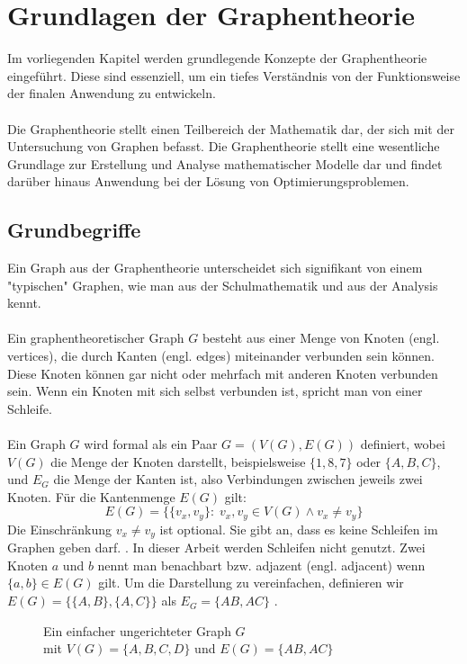 \newpage
\section{Grundlagen der Graphentheorie}
Im vorliegenden Kapitel werden grundlegende Konzepte der Graphentheorie eingeführt. 
Diese sind essenziell, um ein tiefes Verständnis von der Funktionsweise der finalen Anwendung zu entwickeln.\\\\
Die Graphentheorie stellt einen Teilbereich der Mathematik dar, der sich mit der Untersuchung von Graphen befasst. 
Die Graphentheorie stellt eine wesentliche Grundlage zur Erstellung und Analyse mathematischer Modelle dar und findet darüber hinaus Anwendung bei der Lösung von Optimierungsproblemen.
\subsection{Grundbegriffe}
Ein Graph aus der Graphentheorie unterscheidet sich signifikant von einem "typischen" Graphen, wie man aus der Schulmathematik und aus der Analysis kennt.\\\\
Ein graphentheoretischer Graph $G$ besteht aus einer Menge von Knoten (engl. vertices), die durch Kanten (engl. edges) miteinander verbunden sein können. 
Diese Knoten können gar nicht oder mehrfach mit anderen Knoten verbunden sein. 
Wenn ein Knoten mit sich selbst verbunden ist, spricht man von einer Schleife. \\\\
Ein Graph $G$ wird formal als ein Paar $G = (V(G), E(G))$ definiert, wobei \(V(G)\) die Menge der Knoten darstellt, beispielsweise \(\{1, 8, 7\}\) oder \(\{A, B, C\}\), und \(E_G\) die Menge der Kanten ist, also Verbindungen zwischen jeweils zwei Knoten.
Für die Kantenmenge \(E(G)\) gilt: 
\begin{equation*}
    E(G) = \{\{v_x, v_y\} \colon \; v_x, v_y \in V(G) \wedge v_x \neq v_y\}
\end{equation*}
Die Einschränkung $v_x\neq v_y$ ist optional.
Sie gibt an, dass es keine Schleifen im Graphen geben darf. \parencite[2]{Diestel2017-bj}.
In dieser Arbeit werden Schleifen nicht genutzt. Zwei Knoten $a$ und $b$ nennt man benachbart bzw. adjazent (engl. adjacent) wenn $\{a,b\} \in E(G)$ gilt. 
Um die Darstellung zu vereinfachen, definieren wir $E(G) = \{\{A,B\},\{A,C\}\}$ als $E_G = \{AB, AC\}$ \parencite[3]{Diestel2017-bj}.
\begin{figure}[H]
    \centering
    
    \caption[caption]{Ein einfacher ungerichteter Graph $G$ \\ mit $V(G)=\{A,B,C,D\}$ und $E(G)=\{{AB, AC}\}$ }
    \label{g1}
\end{figure}
